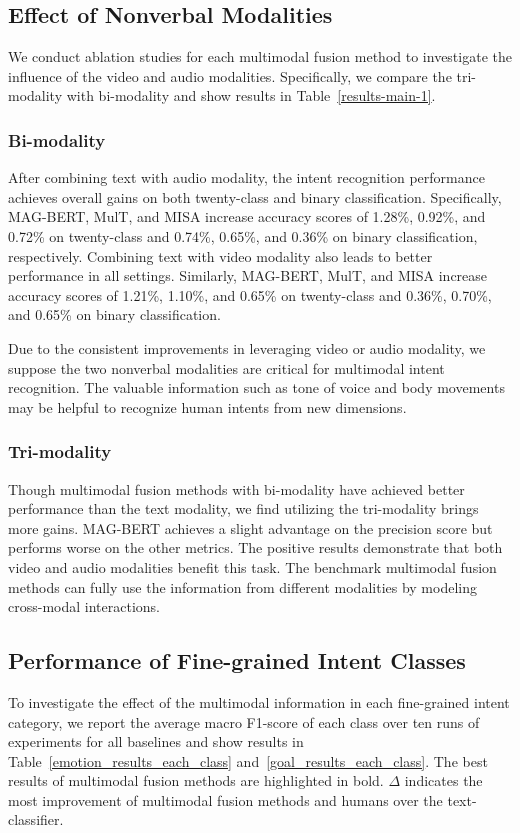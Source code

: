 \documentclass[sigconf,camera-ready]{acmart}
\begin{document}
\subsection{Effect of Nonverbal Modalities}
We conduct ablation studies for each multimodal fusion method to investigate the influence of the video and audio modalities. Specifically, we compare the tri-modality with bi-modality and show results in Table~\ref{results-main-1}.

\subsubsection{Bi-modality} 
After combining text with audio modality, the intent recognition performance achieves overall gains on both twenty-class and binary classification. Specifically, MAG-BERT, MulT, and MISA  increase accuracy scores of 1.28\%, 0.92\%, and 0.72\% on twenty-class and 0.74\%, 0.65\%, and 0.36\% on binary classification, respectively. Combining text with video modality also leads to better performance in all settings. Similarly, MAG-BERT, MulT, and MISA increase accuracy scores of 1.21\%, 1.10\%, and 0.65\% on twenty-class and 0.36\%, 0.70\%, and 0.65\% on binary classification. 

Due to the consistent improvements in leveraging video or audio modality, we suppose the two nonverbal modalities are critical for multimodal intent recognition. The valuable information such as tone of voice and body movements may be helpful to recognize human intents from new dimensions. 

\subsubsection{Tri-modality}
Though multimodal fusion methods with bi-modality have achieved better performance than the text modality, we find utilizing the tri-modality brings more gains. MAG-BERT achieves a slight advantage on the precision score but performs worse on the other metrics. The positive results demonstrate that both video and audio modalities benefit this task. The benchmark multimodal fusion methods can fully use the information from different modalities by modeling cross-modal interactions.

\subsection{Performance of Fine-grained Intent Classes}
To investigate the effect of the multimodal information in each fine-grained intent category, we report the average macro F1-score of each class over ten runs of experiments for all baselines and show results in Table~\ref{emotion_results_each_class} and~\ref{goal_results_each_class}. The best results of multimodal fusion methods are highlighted in bold. $\Delta$ indicates the most improvement of multimodal fusion methods and humans over the text-classifier. 
\end{document}

